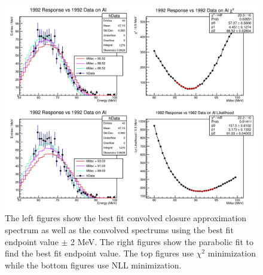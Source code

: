 

\begin{figure}[h]
  \centering
  \includegraphics[width=0.8\linewidth]{figures/png/1992_resp_1992_Al_data_allPlots.png}
  \caption{The left figures show the best fit convolved closure approximation spectrum as well
  as the convolved spectrums using the best fit endpoint value $\pm$ 2 MeV. The right figures
  show the parabolic fit to find the best fit endpoint value. The top figures use $\chi ^2$ 
  minimization while the bottom figures use NLL minimization.}
  \label{fig:1992AlFits}
\end{figure}


